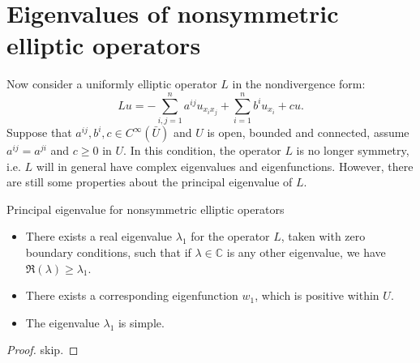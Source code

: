\section{Eigenvalues of nonsymmetric elliptic operators}
Now consider a uniformly elliptic operator $L$ in the nondivergence form:
\begin{equation}
    Lu=-\sum_{i,j=1}^{n}a^{ij}u_{x_{i}x_{j}}+\sum_{i=1}^{n}b^{i}u_{x_{i}}+cu.
\end{equation}
Suppose that $a^{ij},b^{i},c\in C^{\infty}(\bar{U})$ and $U$ is open, bounded and connected, assume $a^{ij}=a^{ji}$ and $c\ge 0$ in $U$. In this condition, the operator $L$ is no longer symmetry, i.e. $L$ will in general have complex eigenvalues and eigenfunctions. However, there are still some properties about the principal eigenvalue of $L$.
\begin{theorem}{Principal eigenvalue for nonsymmetric elliptic operators}
    \begin{itemize}
        \item There exists a real eigenvalue $\lambda_{1}$ for the operator $L$, taken with zero boundary conditions, such that if $\lambda\in\mathbb{C}$ is any other eigenvalue, we have $\Re(\lambda)\ge\lambda_{1}$.
        \item There exists a corresponding eigenfunction $w_{1}$, which is positive within $U$.
        \item The eigenvalue $\lambda_{1}$ is simple.
    \end{itemize}
\end{theorem}
\begin{proof}
    skip.
\end{proof}